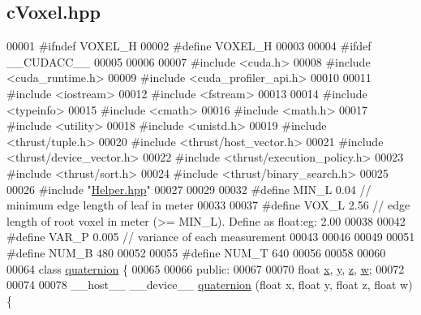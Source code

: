 \hypertarget{cVoxel_8hpp_source}{}\subsection{c\+Voxel.\+hpp}
\label{cVoxel_8hpp_source}

\begin{DoxyCode}
00001 \textcolor{preprocessor}{#ifndef VOXEL\_H}
00002 \textcolor{preprocessor}{#define VOXEL\_H}
00003 
00004 \textcolor{preprocessor}{#ifdef \_\_CUDACC\_\_}
00005 
00006 
00007 \textcolor{preprocessor}{#include <cuda.h>}
00008 \textcolor{preprocessor}{#include <cuda\_runtime.h>}
00009 \textcolor{preprocessor}{#include <cuda\_profiler\_api.h>}
00010 
00011 \textcolor{preprocessor}{#include <iostream>}
00012 \textcolor{preprocessor}{#include <fstream>}
00013 
00014 \textcolor{preprocessor}{#include <typeinfo>}
00015 \textcolor{preprocessor}{#include <cmath>}
00016 \textcolor{preprocessor}{#include <math.h>}
00017 \textcolor{preprocessor}{#include <utility>}
00018 \textcolor{preprocessor}{#include <unistd.h>}
00019 \textcolor{preprocessor}{#include <thrust/tuple.h>}
00020 \textcolor{preprocessor}{#include <thrust/host\_vector.h>}
00021 \textcolor{preprocessor}{#include <thrust/device\_vector.h>}
00022 \textcolor{preprocessor}{#include <thrust/execution\_policy.h>}
00023 \textcolor{preprocessor}{#include <thrust/sort.h>}
00024 \textcolor{preprocessor}{#include <thrust/binary\_search.h>}
00025 
00026 \textcolor{preprocessor}{#include "\hyperlink{Helper_8hpp}{Helper.hpp}"}
00027 
00029 
00032 \textcolor{preprocessor}{#define MIN\_L 0.04 // minimum edge length of leaf in meter}
00033 
00037 \textcolor{preprocessor}{#define VOX\_L 2.56 // edge length of root voxel in meter (>= MIN\_L). Define as float:eg: 2.00}
00038 
00042 \textcolor{preprocessor}{#define VAR\_P 0.005 // variance of each measurement}
00043 
00046 
00049 
00051 \textcolor{preprocessor}{#define NUM\_B 480}
00052 
00055 \textcolor{preprocessor}{#define NUM\_T 640}
00056 
00058 
00060 
00064 \textcolor{keyword}{class }\hyperlink{classquaternion}{quaternion} \{
00065 
00066 \textcolor{keyword}{public}:
00067 
00070     \textcolor{keywordtype}{float} \hyperlink{classquaternion_acdcda48f9dd7ff35873aae38fa33ab78}{x}, \hyperlink{classquaternion_a48e3d1fbf5e12eb54985c32b45dd8303}{y}, \hyperlink{classquaternion_a538598007238d399f79ddcecd39ef5cf}{z}, \hyperlink{classquaternion_ab2b38aca1971114e0ba4218b75d7f472}{w};
00072 
00074 
00078     \_\_host\_\_ \_\_device\_\_ \hyperlink{classquaternion_a7939abaec2de1b11ff2208cbd8fbd93e}{quaternion} (\textcolor{keywordtype}{float} x, \textcolor{keywordtype}{float} y, \textcolor{keywordtype}{float} z, \textcolor{keywordtype}{float} w) \{

\end{DoxyCode}
